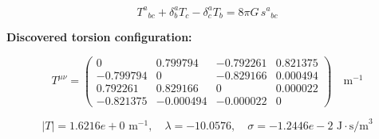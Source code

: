 
\begin{equation}
  T^a{}_{bc} + \delta^a_b T_c - \delta^a_c T_b = 8\pi G \, s^a{}_{bc}
\end{equation}

\textbf{Discovered torsion configuration:}

\begin{equation}
  T^{\mu\nu} = \begin{pmatrix}
    0 & 0.799794 & -0.792261 & 0.821375 \\
    -0.799794 & 0 & -0.829166 & 0.000494 \\
    0.792261 & 0.829166 & 0 & 0.000022 \\
    -0.821375 & -0.000494 & -0.000022 & 0
  \end{pmatrix} \quad \text{m}^{-1}
\end{equation}

\begin{equation}
  |T| = 1.6216e+0 \text{ m}^{-1}, \quad
  \lambda = -10.0576, \quad
  \sigma = -1.2446e-2 \text{ J}\cdot\text{s/m}^3
\end{equation}